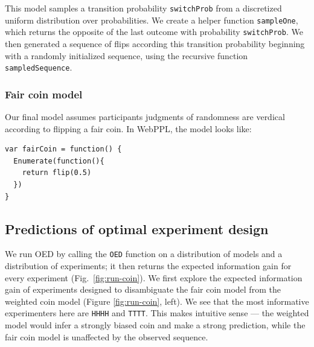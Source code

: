 \documentclass{article}
\begin{document}
This model samples a transition probability \lstinline{switchProb} from a discretized uniform distribution over probabilities.
We create a helper function \lstinline{sampleOne}, which returns the opposite of the last outcome with probability \lstinline{switchProb}.
We then generated a sequence of flips according this transition probability beginning with a randomly initialized sequence, using the recursive function \lstinline{sampledSequence}.

\subsubsection{Fair coin model}
\label{s:tutorial:sss:fair}

Our final model assumes participants judgments of randomness are verdical according to flipping a fair coin. In WebPPL, the model looks like:

\begin{lstlisting}[caption=Fair coin model,  label={lst:m_fair}]
var fairCoin = function() {
  Enumerate(function(){
    return flip(0.5)
  })
}
\end{lstlisting}

\subsection{Predictions of optimal experiment design}

We run OED by calling the \lstinline{OED} function on a distribution of models and a distribution of experiments; it then returns the expected information gain for every experiment (Fig.~\ref{fig:run-coin}).
We first explore the expected information gain of experiments designed to disambiguate the fair coin model from the weighted coin model (Figure \ref{fig:run-coin}, left).
We see that the most informative experimenters here are \lstinline{HHHH} and \lstinline{TTTT}.
This makes intuitive sense --- the weighted model would infer a strongly biased coin and make a strong prediction, while the fair coin model is unaffected by the observed sequence.
\end{document}

